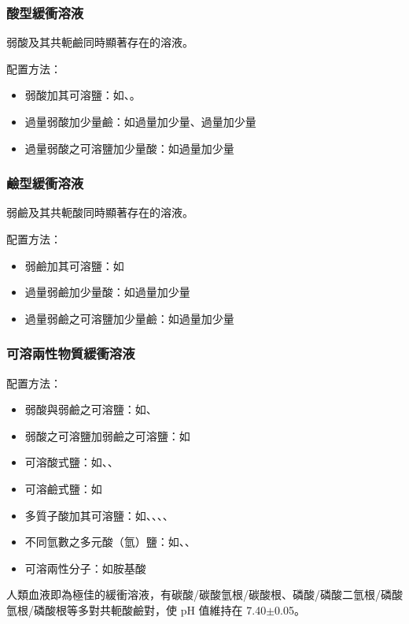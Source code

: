 \documentclass[a4paper,12pt]{article}
\begin{document}
\subsubsection{酸型緩衝溶液}
弱酸及其共軛鹼同時顯著存在的溶液。

配置方法：
\begin{itemize}
\item 弱酸加其可溶鹽：如、。
\item 過量弱酸加少量鹼：如過量加少量、過量加少量
\item 過量弱酸之可溶鹽加少量酸：如過量加少量
\end{itemize}
\subsubsection{鹼型緩衝溶液}
弱鹼及其共軛酸同時顯著存在的溶液。

配置方法：
\begin{itemize}
\item 弱鹼加其可溶鹽：如
\item 過量弱鹼加少量酸：如過量加少量
\item 過量弱鹼之可溶鹽加少量鹼：如過量加少量
\end{itemize}
\subsubsection{可溶兩性物質緩衝溶液}
配置方法：
\begin{itemize}
\item 弱酸與弱鹼之可溶鹽：如、
\item 弱酸之可溶鹽加弱鹼之可溶鹽：如
\item 可溶酸式鹽：如、、
\item 可溶鹼式鹽：如
\item 多質子酸加其可溶鹽：如、、、、
\item 不同氫數之多元酸（氫）鹽：如、、
\item 可溶兩性分子：如胺基酸
\end{itemize}
人類血液即為極佳的緩衝溶液，有碳酸/碳酸氫根/碳酸根、磷酸/磷酸二氫根/磷酸氫根/磷酸根等多對共軛酸鹼對，使 pH 值維持在 7.40$\pm$0.05。
\end{document}
